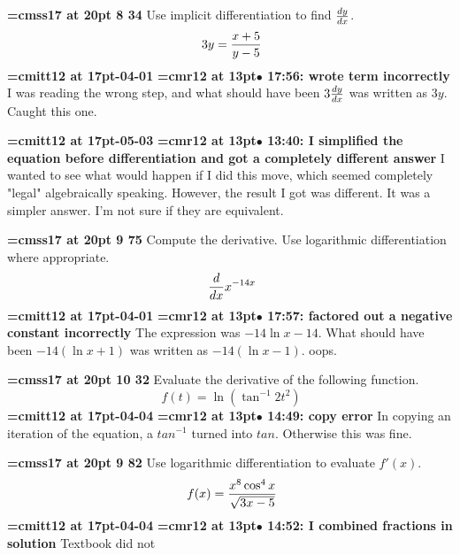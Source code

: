 {\medskip\noindent\bf\font\titlefont=cmss17 at 20pt 8 34}\medskip
Use implicit differentiation to find ${dy \over dx}$.
$$\
3y = {x + 5 \over y - 5}
$$
{\medskip\noindent\bf\font\titlefont=cmitt12 at 17pt-04-01}\medskip
{\smallskip\noindent\bf\font\titlefont=cmr12 at 13pt\titlefont $\bullet$ 17:56: wrote term incorrectly}\smallskip
I was reading the wrong step, and what should have been $3{dy \over dx}$ was written as $3y$. Caught this one.
\par

{\medskip\noindent\bf\font\titlefont=cmitt12 at 17pt-05-03}\medskip
{\smallskip\noindent\bf\font\titlefont=cmr12 at 13pt\titlefont $\bullet$ 13:40: I simplified the equation before differentiation and got a completely different answer}\smallskip
I wanted to see what would happen if I did this move, which seemed completely "legal" algebraically speaking. However, the result I got was different. It was a simpler answer. I'm not sure if they are equivalent.
\par

{\medskip\noindent\bf\font\titlefont=cmss17 at 20pt 9 75}\medskip
Compute the derivative. Use logarithmic differentiation where
appropriate.
$$\
{d \over dx}
x^{-14x}
$$
{\medskip\noindent\bf\font\titlefont=cmitt12 at 17pt-04-01}\medskip
{\smallskip\noindent\bf\font\titlefont=cmr12 at 13pt\titlefont $\bullet$ 17:57: factored out a negative constant incorrectly}\smallskip
The expression was $-14\ln x - 14$. What should have been $-14(\ln x + 1)$ was written as $-14 (\ln x - 1)$. oops.
\par

{\medskip\noindent\bf\font\titlefont=cmss17 at 20pt 10 32}\medskip
Evaluate the derivative of the following function.
$$\
f(t) = \ln (\tan^{-1} 2t^{2})
$$
{\medskip\noindent\bf\font\titlefont=cmitt12 at 17pt-04-04}\medskip
{\smallskip\noindent\bf\font\titlefont=cmr12 at 13pt\titlefont $\bullet$ 14:49: copy error}\smallskip
In copying an iteration of the equation, a $tan^{-1}$ turned into $tan$. Otherwise this was fine.
\par

\xrdef{node113}
{\medskip\noindent\bf\font\titlefont=cmss17 at 20pt 9 82}\medskip
Use logarithmic differentiation to evaluate $f'(x)$.
$$\
f(x) = {
x^8\cos^4 x
\over
\sqrt{3x - 5}
}
$$
{\medskip\noindent\bf\font\titlefont=cmitt12 at 17pt-04-04}\medskip
{\smallskip\noindent\bf\font\titlefont=cmr12 at 13pt\titlefont $\bullet$ 14:52: I combined fractions in solution}\smallskip
Textbook did not
\par

